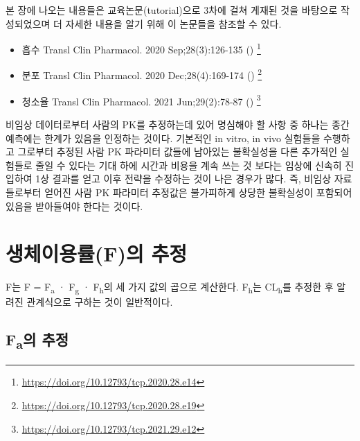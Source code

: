 \documentclass[
  11pt,
  krantz2, a4paper, twoside]{krantz}
\providecommand{\tightlist}{%
  \setlength{\itemsep}{0pt}\setlength{\parskip}{0pt}}
\begin{document}
본 장에 나오는 내용들은 교육논문(tutorial)으로 3차에 걸쳐 게재된 것을 바탕으로 작성되었으며 더 자세한 내용을 알기 위해 이 논문들을 참조할 수 있다.

\begin{itemize}
\tightlist
\item
  흡수 Transl Clin Pharmacol. 2020 Sep;28(3):126-135 () \footnote{\url{https://doi.org/10.12793/tcp.2020.28.e14}}
\item
  분포 Transl Clin Pharmacol. 2020 Dec;28(4):169-174 () \footnote{\url{https://doi.org/10.12793/tcp.2020.28.e19}}
\item
  청소율 Transl Clin Pharmacol. 2021 Jun;29(2):78-87 () \footnote{\url{https://doi.org/10.12793/tcp.2021.29.e12}}
\end{itemize}

비임상 데이터로부터 사람의 PK를 추정하는데 있어 명심해야 할 사항 중 하나는 종간 예측에는 한계가 있음을 인정하는 것이다.
기본적인 in vitro, in vivo 실험들을 수행하고 그로부터 추정된 사람 PK 파라미터 값들에 남아있는 불확실성을 다른 추가적인 실험들로 줄일 수 있다는 기대 하에 시간과 비용을 계속 쓰는 것 보다는 임상에 신속히 진입하여 1상 결과를 얻고 이후 전략을 수정하는 것이 나은 경우가 많다.
즉, 비임상 자료들로부터 얻어진 사람 PK 파라미터 추정값은 불가피하게 상당한 불확실성이 포함되어 있음을 받아들여야 한다는 것이다.

\section{생체이용률(F)의 추정}\label{uxc0dduxccb4uxc774uxc6a9uxb960fuxc758-uxcd94uxc815}

F는 F = F\textsubscript{a} · F\textsubscript{g} · F\textsubscript{h}의 세 가지 값의 곱으로 계산한다.
F\textsubscript{h}는 CL\textsubscript{h}를 추정한 후 알려진 관계식으로 구하는 것이 일반적이다.

\subsection{\texorpdfstring{F\textsubscript{a}의 추정}{Fa의 추정}}\label{fauxc758-uxcd94uxc815}
\end{document}
